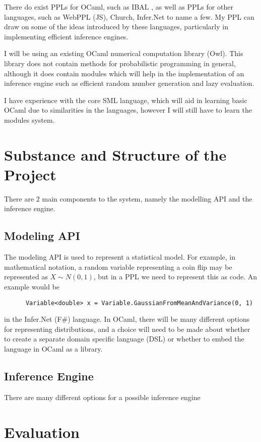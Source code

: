 There do exist PPLs for OCaml, such as IBAL \cite{kiselyov2009embedded}, as well as PPLs for other languages, such as WebPPL (JS), Church, Infer.Net to name a few. My PPL can draw on some of the ideas introduced by these languages, particularly in implementing efficient inference engines.

I will be using an existing OCaml numerical computation library (Owl). This library does not contain methods for probabilistic programming in general, although it does contain modules which will help in the implementation of an inference engine such as efficient random number generation and lazy evaluation.

I have experience with the core SML language, which will aid in learning basic OCaml due to similarities in the languages, however I will still have to learn the modules system.

\section*{Substance and Structure of the Project}

There are 2 main components to the system, namely the modelling API and the inference engine.

\subsection*{Modeling API}
The modeling API is used to represent a statistical model. For example, in mathematical notation, a random variable representing a coin flip may be represented as $X \sim N(0,1)$, but in a PPL we need to represent this as code. An example would be
\begin{verbatim}
      Variable<double> x = Variable.GaussianFromMeanAndVariance(0, 1)
\end{verbatim}
in the Infer.Net (F\#) language. In OCaml, there will be many different options for representing distributions, and a choice will need to be made about whether to create a separate domain specific language (DSL) or whether to embed the language in OCaml as a library.

\subsection*{Inference Engine}
There are many different options for a possible inference engine

\section*{Evaluation}

